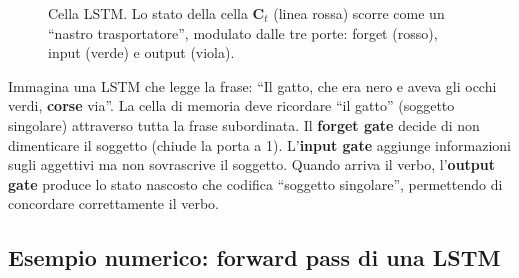 \documentclass[12pt,a4paper]{article}
\begin{document}
\begin{figure}[H]
\caption{Cella LSTM. Lo stato della cella $\mathbf{C}_t$ (linea rossa) scorre come un ``nastro trasportatore'', modulato dalle tre porte: forget (rosso), input (verde) e output (viola).}
\label{fig:lstm_cell}
\end{figure}

\begin{examplebox}
Immagina una LSTM che legge la frase: ``Il gatto, che era nero e aveva gli occhi verdi, \textbf{corse} via''. La cella di memoria deve ricordare ``il gatto'' (soggetto singolare) attraverso tutta la frase subordinata. Il \textbf{forget gate} decide di non dimenticare il soggetto (chiude la porta a 1). L'\textbf{input gate} aggiunge informazioni sugli aggettivi ma non sovrascrive il soggetto. Quando arriva il verbo, l'\textbf{output gate} produce lo stato nascosto che codifica ``soggetto singolare'', permettendo di concordare correttamente il verbo.
\end{examplebox}

\subsection{Esempio numerico: forward pass di una LSTM}
\end{document}
